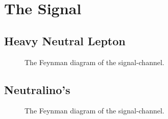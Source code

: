 \section{The Signal}
\subsection{Heavy Neutral Lepton}
\begin{figure}
    \centering
    \caption{The Feynman diagram of the signal-channel.}
\end{figure}
\subsection{Neutralino's}
\begin{figure}
    \centering
    \caption{The Feynman diagram of the signal-channel.}
\end{figure}